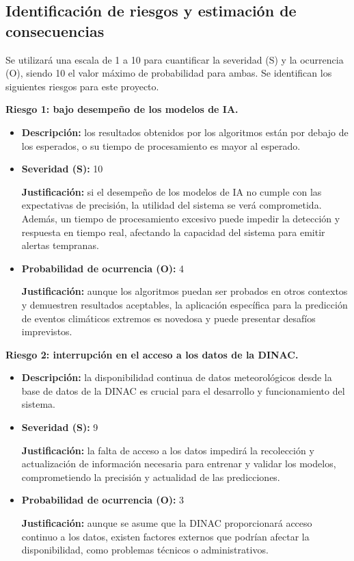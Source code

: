 \documentclass[
11pt, %
codirector, %
]{charter}
\begin{document}
\subsection{Identificación de riesgos y estimación de consecuencias}

Se utilizará una escala de 1 a 10 para cuantificar la severidad (S) y la ocurrencia (O), siendo 10 el valor máximo de probabilidad para ambas. Se identifican los siguientes riesgos para este proyecto.

\textbf{Riesgo 1: bajo desempeño de los modelos de IA.}
\begin{itemize}
  \item \textbf{Descripción:} los resultados obtenidos por los algoritmos están por debajo de los esperados, o su tiempo de procesamiento es mayor al esperado.
  \item \textbf{Severidad (S):} 10
  
  \textbf{Justificación:} si el desempeño de los modelos de IA no cumple con las expectativas de precisión, la utilidad del sistema se verá comprometida. Además, un tiempo de procesamiento excesivo puede impedir la detección y respuesta en tiempo real, afectando la capacidad del sistema para emitir alertas tempranas.
  \item \textbf{Probabilidad de ocurrencia (O):} 4
  
  \textbf{Justificación:} aunque los algoritmos puedan ser probados en otros contextos y demuestren resultados aceptables, la aplicación específica para la predicción de eventos climáticos extremos es novedosa y puede presentar desafíos imprevistos.
\end{itemize}

\textbf{Riesgo 2: interrupción en el acceso a los datos de la DINAC.}

\begin{itemize}
  \item \textbf{Descripción:} la disponibilidad continua de datos meteorológicos desde la base de datos de la DINAC es crucial para el desarrollo y funcionamiento del sistema.
  \item \textbf{Severidad (S):} 9
  
  \textbf{Justificación:} la falta de acceso a los datos impedirá la recolección y actualización de información necesaria para entrenar y validar los modelos, comprometiendo la precisión y actualidad de las predicciones.
  \item \textbf{Probabilidad de ocurrencia (O):} 3
  
  \textbf{Justificación:} aunque se asume que la DINAC proporcionará acceso continuo a los datos, existen factores externos que podrían afectar la disponibilidad, como problemas técnicos o administrativos.
\end{itemize}
\end{document}
